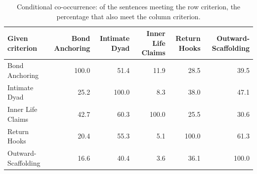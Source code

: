 \begin{table}[t]
\centering
\small
\caption{Conditional co-occurrence: of the sentences meeting the row criterion, the percentage that also meet the column criterion.}
\label{tab:cooccurrence}
\begin{tabular}{lrrrrr}
\toprule
Given criterion & Bond Anchoring & Intimate Dyad & Inner Life Claims & Return Hooks & Outward-Scaffolding \\
\midrule
Bond Anchoring & 100.0 & 51.4 & 11.9 & 28.5 & 39.5 \\
Intimate Dyad & 25.2 & 100.0 & 8.3 & 38.0 & 47.1 \\
Inner Life Claims & 42.7 & 60.3 & 100.0 & 25.5 & 30.6 \\
Return Hooks & 20.4 & 55.3 & 5.1 & 100.0 & 61.3 \\
Outward-Scaffolding & 16.6 & 40.4 & 3.6 & 36.1 & 100.0 \\
\bottomrule
\end{tabular}
\end{table}
